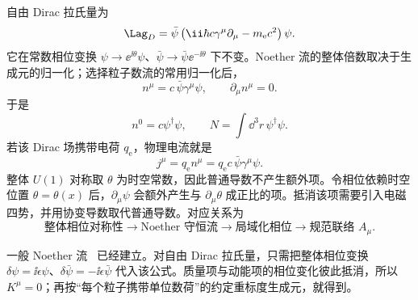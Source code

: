 \begin{exbox}
自由 Dirac 拉氏量为
\begin{equation*}
 \Lag_D
 =\bar\psi\left(\ii\hbar c\gamma^\mu\partial_\mu-m_{\mathrm e} c^2\right)\psi.
\end{equation*}
它在常数相位变换 $\psi\to \ee^{\ii\theta}\psi$、$\bar\psi\to\bar\psi \ee^{-\ii\theta}$ 下不变。Noether 流的整体倍数取决于生成元的归一化；选择粒子数流的常用归一化后，
\begin{equation}
 \boxed{n^\mu=c\,\bar\psi\gamma^\mu\psi,
 \qquad \partial_\mu n^\mu=0.}
 \label{eq:dirac-number-current-dp61}
\end{equation}
于是
\begin{equation*}
 n^0=c\psi^\dagger\psi,
 \qquad
 N=\int\dd^3 r\,\psi^\dagger\psi.
\end{equation*}
若该 Dirac 场携带电荷 $q_{\mathrm e}$，物理电流就是
\begin{equation}
 \boxed{j^\mu=q_{\mathrm e} n^\mu=q_{\mathrm e} c\,\bar\psi\gamma^\mu\psi.}
 \label{eq:dirac-electric-current-from-noether-dp61}
\end{equation}
整体 $U(1)$ 对称取 $\theta$ 为时空常数，因此普通导数不产生额外项。令相位依赖时空位置 $\theta=\theta(x)$ 后，$\partial_\mu\psi$ 会额外产生与 $\partial_\mu\theta$ 成正比的项。抵消该项需要引入电磁四势，并用协变导数取代普通导数。对应关系为
\[
 \text{整体相位对称性}
 \longrightarrow \text{Noether 守恒流}
 \longrightarrow \text{局域化相位}
 \longrightarrow \text{规范联络 }A_\mu.
\]

\medskip

一般 Noether 流~ 已经建立。对自由 Dirac 拉氏量，只需把整体相位变换 $\delta\psi=\ii\epsilon\psi$、$\delta\bar\psi=-\ii\epsilon\bar\psi$ 代入该公式。质量项与动能项的相位变化彼此抵消，所以 $K^\mu=0$；再按“每个粒子携带单位数荷”的约定重标度生成元，就得到。


\end{exbox}
